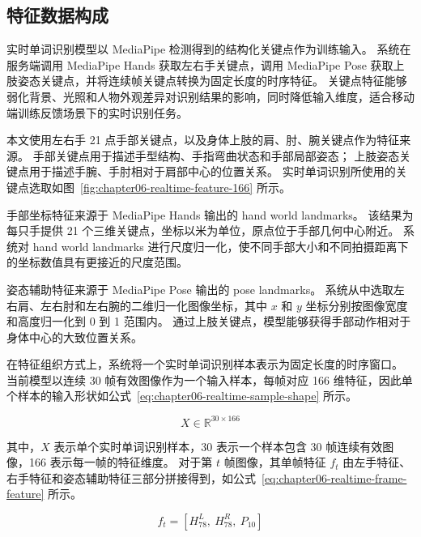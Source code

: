 
\subsection{特征数据构成}

实时单词识别模型以 MediaPipe 检测得到的结构化关键点作为训练输入。
系统在服务端调用 MediaPipe Hands 获取左右手关键点，调用 MediaPipe Pose 获取上肢姿态关键点，并将连续帧关键点转换为固定长度的时序特征。
关键点特征能够弱化背景、光照和人物外观差异对识别结果的影响，同时降低输入维度，适合移动端训练反馈场景下的实时识别任务。

本文使用左右手 21 点手部关键点，以及身体上肢的肩、肘、腕关键点作为特征来源。
手部关键点用于描述手型结构、手指弯曲状态和手部局部姿态；
上肢姿态关键点用于描述手腕、手肘相对于肩部中心的位置关系。
实时单词识别所使用的关键点选取如图~\ref{fig:chapter06-realtime-feature-166} 所示。


手部坐标特征来源于 MediaPipe Hands 输出的 hand world landmarks。
该结果为每只手提供 21 个三维关键点，坐标以米为单位，原点位于手部几何中心附近。
系统对 hand world landmarks 进行尺度归一化，使不同手部大小和不同拍摄距离下的坐标数值具有更接近的尺度范围。

姿态辅助特征来源于 MediaPipe Pose 输出的 pose landmarks。
系统从中选取左右肩、左右肘和左右腕的二维归一化图像坐标，其中 $x$ 和 $y$ 坐标分别按图像宽度和高度归一化到 0 到 1 范围内。
通过上肢关键点，模型能够获得手部动作相对于身体中心的大致位置关系。

在特征组织方式上，系统将一个实时单词识别样本表示为固定长度的时序窗口。
当前模型以连续 30 帧有效图像作为一个输入样本，每帧对应 166 维特征，因此单个样本的输入形状如公式~\ref{eq:chapter06-realtime-sample-shape} 所示。

\begin{equation}
X \in \mathbb{R}^{30\times166}
\label{eq:chapter06-realtime-sample-shape}
\end{equation}

其中，$X$ 表示单个实时单词识别样本，30 表示一个样本包含 30 帧连续有效图像，166 表示每一帧的特征维度。
对于第 $t$ 帧图像，其单帧特征 $f_t$ 由左手特征、右手特征和姿态辅助特征三部分拼接得到，如公式~\ref{eq:chapter06-realtime-frame-feature} 所示。

\begin{equation}
f_t = [H^L_{78},\ H^R_{78},\ P_{10}]
\label{eq:chapter06-realtime-frame-feature}
\end{equation}

